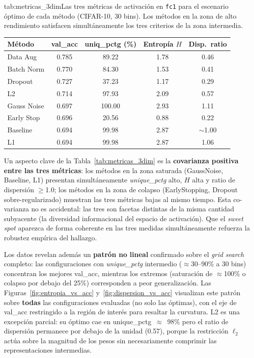 \begin{table}{tab:metricas_3dim}{Las tres métricas de activación en \texttt{fc1} para
el escenario óptimo de cada método (CIFAR-10, 30 bins). Los métodos en la zona de
alto rendimiento satisfacen simultáneamente los tres criterios de la zona intermedia.}
\small
\begin{tabular}{lcccc}
\toprule
\textbf{Método} & \textbf{val\_acc} & \textbf{uniq\_pctg (\%)} & \textbf{Entropía $H$}
  & \textbf{Disp.\ ratio} \\
\midrule
Data Aug    & 0.785 &  89.22 & 1.78 & 0.46 \\
Batch Norm  & 0.770 &  84.30 & 1.53 & 0.41 \\
Dropout     & 0.727 &  37.23 & 1.17 & 0.29 \\
L2          & 0.714 &  97.93 & 2.09 & 0.57 \\
Gauss Noise & 0.697 & 100.00 & 2.93 & 1.11 \\
Early Stop  & 0.696 &  20.56 & 0.88 & 0.22 \\
Baseline    & 0.694 &  99.98 & 2.87 & $\sim$1.00 \\
L1          & 0.694 &  99.98 & 2.87 & 1.06 \\
\bottomrule
\end{tabular}
\end{table}

Un aspecto clave de la Tabla~\ref{tab:metricas_3dim} es la \textbf{covarianza positiva
entre las tres métricas}: los métodos en la zona saturada (GaussNoise, Baseline, L1)
presentan simultáneamente \textit{unique\_pctg} alto, $H$ alta y ratio de dispersión
$\geq$1.0; los métodos en la zona de colapso (EarlyStopping, Dropout sobre-regularizado)
muestran las tres métricas bajas al mismo tiempo. Esta co-varianza no es accidental: las
tres son facetas distintas de la misma cantidad subyacente (la diversidad informacional
del espacio de activación). Que el \textit{sweet spot} aparezca de forma coherente en
las tres medidas simultáneamente refuerza la robustez empírica del hallazgo.

Los datos revelan además un \textbf{patrón no lineal} confirmado sobre el \textit{grid
search} completo: las configuraciones con \textit{unique\_pctg} intermedio
($\approx$30--90\% a 30 bins) concentran los mejores val\_acc, mientras los extremos
(saturación de $\approx$100\% o colapso por debajo del 25\%) corresponden a peor
generalización. Las Figuras~\ref{fig:entropia_vs_acc} y~\ref{fig:dispersion_vs_acc}
visualizan este patrón sobre \textbf{todas} las configuraciones evaluadas (no solo las
óptimas), con el eje de val\_acc restringido a la región de interés para resaltar la
curvatura. L2 es una excepción parcial: su óptimo cae en unique\_pctg~$\approx$~98\%
pero el ratio de dispersión permanece por debajo de la unidad (0.57), porque la
restricción $\ell_2$ actúa sobre la magnitud de los pesos sin necesariamente comprimir
las representaciones intermedias.

